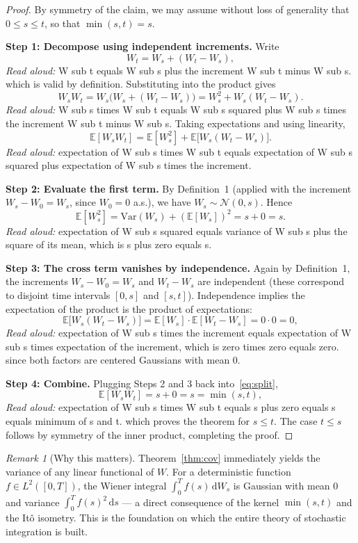 \documentclass[11pt]{article}
\theoremstyle{definition}
\theoremstyle{remark}
\newtheorem{remark}[theorem]{Remark}
\newcommand{\E}{\mathbb{E}}
\newcommand{\Var}{\mathrm{Var}}
\renewcommand{\d}{\mathrm{d}}
\begin{document}
\begin{proof}
By symmetry of the claim, we may assume without loss of generality that
$0 \leq s \leq t$, so that $\min(s,t) = s$.

\textbf{Step 1: Decompose using independent increments.}
Write
$$W_t = W_s + (W_t - W_s),$$
\emph{Read aloud:} W sub t equals W sub s plus the increment W sub t minus W sub s.
which is valid by definition. Substituting into the product gives
$$W_s W_t = W_s \big( W_s + (W_t - W_s) \big) = W_s^2 + W_s(W_t - W_s).$$
\emph{Read aloud:} W sub s times W sub t equals W sub s squared plus W sub s times the increment W sub t minus W sub s.
Taking expectations and using linearity,
\begin{equation}\label{eq:split}
  \E[W_s W_t] = \E[W_s^2] + \E\big[W_s (W_t - W_s)\big].
\end{equation}
\emph{Read aloud:} expectation of W sub s times W sub t equals expectation of W sub s squared plus expectation of W sub s times the increment.

\textbf{Step 2: Evaluate the first term.}
By Definition~1 (applied with the increment $W_s - W_0 = W_s$, since
$W_0 = 0$ a.s.), we have $W_s \sim \mathcal{N}(0, s)$. Hence
$$\E[W_s^2] = \Var(W_s) + (\E[W_s])^2 = s + 0 = s.$$
\emph{Read aloud:} expectation of W sub s squared equals variance of W sub s plus the square of its mean, which is s plus zero equals s.

\textbf{Step 3: The cross term vanishes by independence.}
Again by Definition~1, the increments $W_s - W_0 = W_s$ and $W_t - W_s$
are independent (these correspond to disjoint time intervals $[0,s]$ and
$[s,t]$). Independence implies the expectation of the product is the
product of expectations:
$$\E\big[W_s (W_t - W_s)\big] = \E[W_s] \cdot \E[W_t - W_s] = 0 \cdot 0 = 0,$$
\emph{Read aloud:} expectation of W sub s times the increment equals expectation of W sub s times expectation of the increment, which is zero times zero equals zero.
since both factors are centered Gaussians with mean $0$.

\textbf{Step 4: Combine.}
Plugging Steps 2 and 3 back into~\eqref{eq:split},
$$\E[W_s W_t] = s + 0 = s = \min(s, t),$$
\emph{Read aloud:} expectation of W sub s times W sub t equals s plus zero equals s equals minimum of s and t.
which proves the theorem for $s \leq t$. The case $t \leq s$ follows by
symmetry of the inner product, completing the proof.
\end{proof}

\begin{remark}[Why this matters]
Theorem~\ref{thm:cov} immediately yields the variance of any linear
functional of $W$. For a deterministic function $f \in L^2([0,T])$, the
Wiener integral $\int_0^T f(s)\, \d W_s$ is Gaussian with mean $0$ and
variance $\int_0^T f(s)^2\, \d s$ — a direct consequence of the kernel
$\min(s,t)$ and the Itô isometry. This is the foundation on which the
entire theory of stochastic integration is built.
\end{remark}
\end{document}
